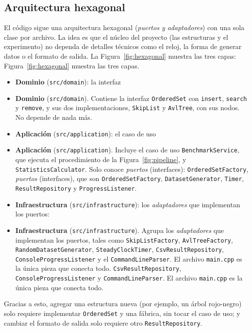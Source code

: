 \documentclass[11pt,a4paper]{article}
\begin{document}
\subsection{Arquitectura hexagonal}

El código sigue una arquitectura hexagonal (\emph{puertos y adaptadores}) con
una sola clase por archivo. La idea es que el núcleo del proyecto (las
estructuras y el experimento) no dependa de detalles técnicos como el reloj,
la forma de generar datos o el formato de salida. La
Figura~\ref{fig:hexagonal} muestra las tres capas:
Figura~\ref{fig:hexagonal} muestra las tres capas.

\begin{itemize}
  \item \textbf{Dominio} (\texttt{src/domain}): la interfaz
  \item \textbf{Dominio} (\texttt{src/domain}). Contiene la interfaz
  \texttt{OrderedSet} con \texttt{insert}, \texttt{search} y
  \texttt{remove}, y sus dos implementaciones, \texttt{SkipList} y
  \texttt{AvlTree}, con sus nodos. No depende de nada más.
  \item \textbf{Aplicación} (\texttt{src/application}): el caso de uso
  \item \textbf{Aplicación} (\texttt{src/application}). Incluye el caso de uso
  \texttt{BenchmarkService}, que ejecuta el procedimiento de la
  Figura~\ref{fig:pipeline}, y \texttt{StatisticsCalculator}. Solo conoce
  \emph{puertos} (interfaces): \texttt{OrderedSetFactory},
  \emph{puertos} (interfaces), que son \texttt{OrderedSetFactory},
  \texttt{DatasetGenerator}, \texttt{Timer}, \texttt{ResultRepository} y
  \texttt{ProgressListener}.
  \item \textbf{Infraestructura} (\texttt{src/infrastructure}): los
  \emph{adaptadores} que implementan los puertos:
  \item \textbf{Infraestructura} (\texttt{src/infrastructure}). Agrupa los
  \emph{adaptadores} que implementan los puertos, tales como
  \texttt{SkipListFactory}, \texttt{AvlTreeFactory},
  \texttt{RandomDatasetGenerator}, \texttt{SteadyClockTimer},
  \texttt{CsvResultRepository}, \texttt{ConsoleProgressListener} y el
  \texttt{CommandLineParser}. El archivo \texttt{main.cpp} es la única
  pieza que conecta todo.
  \texttt{CsvResultRepository}, \texttt{ConsoleProgressListener} y
  \texttt{CommandLineParser}. El archivo \texttt{main.cpp} es la única pieza
  que conecta todo.
\end{itemize}

Gracias a esto, agregar una estructura nueva (por ejemplo, un árbol
rojo-negro) solo requiere implementar \texttt{OrderedSet} y una fábrica, sin
tocar el caso de uso; y cambiar el formato de salida solo requiere otro
\texttt{ResultRepository}.
\end{document}

